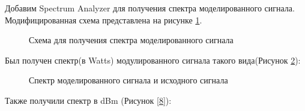 \documentclass[a4paper,14pt]{extarticle}
\begin{document}
Добавим Spectrum Analyzer для получения спектра моделированного сигнала. Модифицированная схема представлена на рисунке \ref{6}.

\begin{figure}[H]
\caption{Схема для получения спектра моделированного сигнала}
\label{6}
\end{figure}

Был получен спектр(в Watts) модулированного сигнала такого вида(Рисунок \ref{7}):

\begin{figure}[H]
\caption{Спектр моделированного сигнала и исходного сигнала}
\label{7}
\end{figure}

Также получили спектр в dBm (Рисунок \ref{8}):
\end{document}
